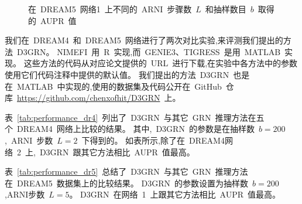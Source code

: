\begin{figure}[!htbp]
\centering

\caption{
在~DREAM5~网络1~上不同的~ARNI~步骤数~$L$~和抽样数目~$b$~取得的~AUPR~值}

\label{fig:performance_dr5}
\end{figure}

我们在~DREAM4~和~DREAM5~网络进行了两次对比实验,来评测我们提出的方法~D3GRN。
NIMEFI~用~R~实现,而~GENIE3、TIGRESS~是用~MATLAB~实现。
这些方法的代码从对应论文提供的~URL~进行下载,在实验中各方法中的参数使用它们代码注释中提供的默认值。
我们提出的方法~D3GRN~也是在~MATLAB~中实现的,使用的数据集及代码公开在~GitHub~仓库~\url{https://github.com/chenxofhit/D3GRN}~上。

表~\ref{tab:performance_dr4}~列出了~D3GRN~与其它~GRN~推理方法在五个~DREAM4~网络上比较的结果。
其中,~D3GRN~的参数是在抽样数~$b=200$,~ARNI~步数~$L=2$~下得到的。
如表所示,除了在~DREAM4网络~2~上,~D3GRN~跟其它方法相比~AUPR~值最高。

表~\ref{tab:performance_dr5}~总结了~D3GRN~与其它~GRN~推理方法在~DREAM5~数据集上的比较结果。
D3GRN~的参数设置为抽样数~$b=200$,ARNI步数~$L=5$。
D3GRN~在网络~1~上跟其它方法相比~AUPR~值最高。


